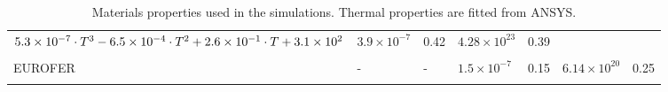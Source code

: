 \begin{table}[ht]
\begin{tabular}{p{1.7cm}  R{3cm}  R{3cm}  R{1.8cm}  R{1cm} R{1.8cm}  R{1cm}}
        $5.3\times 10^{-7}\cdot T^3\newline %
        -6.5\times 10^{-4}\cdot T^2\newline %
        +2.6\times 10^{-1}\cdot T\newline %
        +3.1\times 10^2$ & %

        $3.9\times 10^{-7}$ & %
        0.42&%
        $4.28\times 10^{23}$ & 0.39\\
        \\
        EUROFER \cite{aiello_hydrogen_2002} & %
        - & - &
        $1.5\times 10^{-7}$ & %
        0.15 & %
        $6.14\times 10^{20}$ & 0.25
        \\
        \\
    \end{tabular}
    \caption{Materials properties used in the simulations. Thermal properties are fitted from ANSYS.}
    \label{tab:materials properties}
\end{table}

